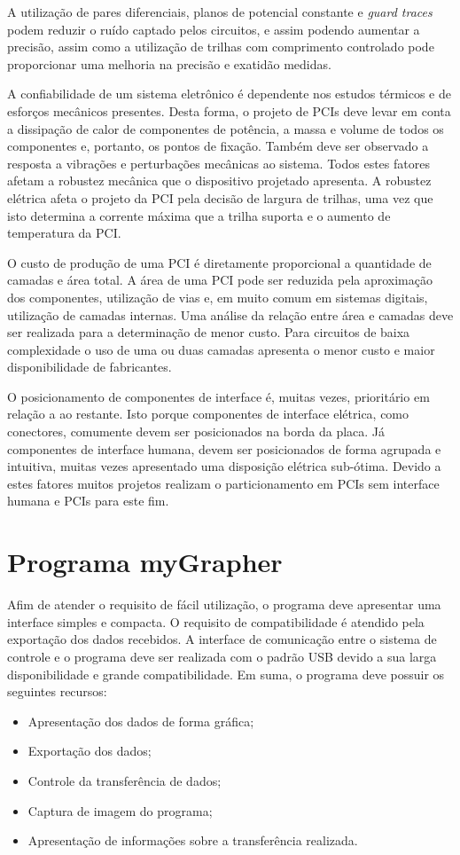 			A utilização de pares diferenciais, planos de potencial constante e \textit{guard traces} podem reduzir o ruído captado pelos circuitos, e assim podendo aumentar a precisão, assim como a utilização de trilhas com comprimento controlado pode proporcionar uma melhoria na precisão e exatidão medidas.

			A confiabilidade de um sistema eletrônico é dependente nos estudos térmicos e de esforços mecânicos presentes. Desta forma, o projeto de PCIs deve levar em conta a dissipação de calor de componentes de potência, a massa e volume de todos os componentes e, portanto, os pontos de fixação. Também deve ser observado a resposta a vibrações e perturbações mecânicas ao sistema. Todos estes fatores afetam a robustez mecânica que o dispositivo projetado apresenta. A robustez elétrica afeta o projeto da PCI pela decisão de largura de trilhas, uma vez que isto determina a corrente máxima que a trilha suporta e o aumento de temperatura da PCI.

			O custo de produção de uma PCI é diretamente proporcional a quantidade de camadas e área total. A área de uma PCI pode ser reduzida pela aproximação dos componentes, utilização de vias e, em muito comum em sistemas digitais, utilização de camadas internas. Uma análise da relação entre área e camadas deve ser realizada para a determinação de menor custo. Para circuitos de baixa complexidade o uso de uma ou duas camadas apresenta o menor custo e maior disponibilidade de fabricantes.

			O posicionamento de componentes de interface é, muitas vezes, prioritário em relação a ao restante. Isto porque componentes de interface elétrica, como conectores, comumente devem ser posicionados na borda da placa. Já componentes de interface humana, devem ser posicionados de forma agrupada e intuitiva, muitas vezes apresentado uma disposição elétrica sub-ótima. Devido a estes fatores muitos projetos realizam o particionamento em PCIs sem interface humana e PCIs para este fim.


		\section{Programa myGrapher}\label{sec:req:sw:pc}


			Afim de atender o requisito de fácil utilização, o programa deve apresentar uma interface simples e compacta. O requisito de compatibilidade é atendido pela exportação dos dados recebidos. A interface de comunicação entre o sistema de controle e o programa deve ser realizada com o padrão USB devido a sua larga disponibilidade e grande compatibilidade. Em suma, o programa deve possuir os seguintes recursos:

			\begin{itemize}\label{lst:swpc:req}
				\item Apresentação dos dados de forma gráfica;
				\item Exportação dos dados;
				\item Controle da transferência de dados;
				\item Captura de imagem do programa;
				\item Apresentação de informações sobre a transferência realizada.
			\end{itemize}
